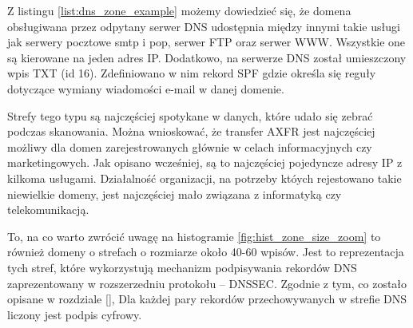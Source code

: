 Z listingu \ref{list:dns_zone_example} możemy dowiedzieć się, że domena obsługiwana przez odpytany serwer DNS udostępnia między innymi takie usługi jak serwery pocztowe smtp i pop, serwer FTP oraz serwer WWW. Wszystkie one są kierowane na jeden adres IP. Dodatkowo, na serwerze DNS został umieszczony wpis TXT (id 16). Zdefiniowano w nim rekord SPF gdzie określa się reguły dotyczące wymiany wiadomości e-mail w danej domenie. 

Strefy tego typu są najczęściej spotykane w danych, które udało się zebrać podczas skanowania. Można wnioskować, że transfer AXFR jest najczęściej możliwy dla domen zarejestrowanych głównie w celach informacyjnych czy marketingowych. Jak opisano wcześniej, są to najczęściej pojedyncze adresy IP z kilkoma usługami. Działalność organizacji, na potrzeby któych rejestowano takie niewielkie domeny, jest najczęściej mało związana z informatyką czy telekomunikacją. 

To, na co warto zwrócić uwagę na histogramie \ref{fig:hist_zone_size_zoom} to również domeny o strefach o rozmiarze około 40-60 wpisów. Jest to reprezentacja tych stref, które wykorzystują mechanizm podpisywania rekordów DNS zaprezentowany w rozszerzedniu protokołu -- DNSSEC\cite{RFC4034, RFC4035}. Zgodnie z tym, co zostało opisane w rozdziale \ref{}, Dla każdej pary rekordów przechowywanych w strefie DNS liczony jest podpis cyfrowy. 



